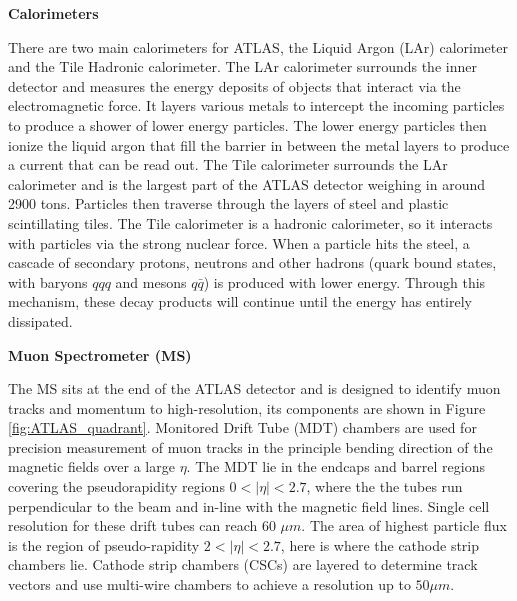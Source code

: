 \pagebreak
\noindent\textbf{Calorimeters}

There are two main calorimeters for ATLAS, the Liquid Argon (LAr) calorimeter and the Tile Hadronic calorimeter.
The LAr calorimeter surrounds the inner detector and measures the energy deposits of objects that interact via the electromagnetic force. 
It layers various metals to intercept the incoming particles to produce a shower of lower energy particles. 
The lower energy particles then ionize the liquid argon that fill the barrier in between the metal layers to produce a current that can be read out.
The Tile calorimeter surrounds the LAr calorimeter and is the largest part of the ATLAS detector weighing in around 2900 tons. 
Particles then traverse through the layers of steel and plastic scintillating tiles. 
The Tile calorimeter is a hadronic calorimeter, so it interacts with particles via the strong nuclear force. 
When a particle hits the steel, a cascade of secondary protons, neutrons and other hadrons (quark bound states, with baryons $qqq$ and mesons $q\bar{q}$) is produced with lower energy. 
Through this mechanism, these decay products will continue until the energy has entirely dissipated.

\noindent\textbf{Muon Spectrometer (MS)}

The MS sits at the end of the ATLAS detector and is designed to identify muon tracks and momentum to high-resolution, its components are shown in Figure \ref{fig:ATLAS_quadrant}.
Monitored Drift Tube (MDT) chambers are used for precision measurement of muon tracks in the principle bending direction of the magnetic fields over a large $\eta$.
The MDT lie in the endcaps and barrel regions covering the pseudorapidity regions $0 < |\eta| < 2.7$, where the the tubes run perpendicular to the beam and in-line with the magnetic field lines.
Single cell resolution for these drift tubes can reach 60 $\mu m$.\cite{ATLAS_Tech_Proposal}
The area of highest particle flux is the region of pseudo-rapidity $2 < |\eta| < 2.7$, here is where the cathode strip chambers lie.\cite{muonSpec}
Cathode strip chambers (CSCs) are layered to determine track vectors and use multi-wire chambers to achieve a resolution up to $50 \mu m$. 

